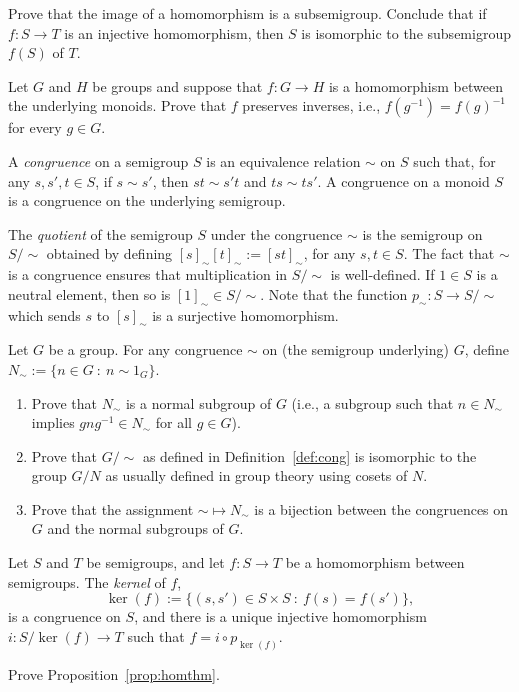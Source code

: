 \begin{exercise}\easy\label{exe:image}
Prove that the image of a homomorphism is a subsemigroup. Conclude that if $f \colon S \to T$ is an injective homomorphism, then $S$ is isomorphic to the subsemigroup $f(S)$ of $T$.
\end{exercise}
\begin{exercise}\easy
  Let $G$ and $H$ be groups and suppose that $f \colon G \to H$ is a homomorphism between the underlying monoids. Prove that $f$ preserves inverses, i.e., $f(g^{-1}) = f(g)^{-1}$ for every $g \in G$.
\end{exercise}

\begin{definition}\label{def:cong}
  A \emph{congruence} on a semigroup $S$ is an equivalence relation $\sim$ on $S$ such that, for any $s, s', t \in S$, if $s \sim s'$, then $st \sim s't$ and $ts \sim ts'$. A congruence on a monoid $S$ is a congruence on the underlying semigroup.

The \emph{quotient} of the semigroup $S$ under the congruence $\sim$ is the semigroup on $S/{\sim}$ obtained by defining $[s]_\sim [t]_\sim := [st]_\sim$, for any $s, t \in S$. The fact that $\sim$ is a congruence ensures that multiplication in $S/{\sim}$ is well-defined. If $1 \in S$ is a neutral element, then so is $[1]_\sim \in S/{\sim}$. Note that the function $p_\sim \colon S \to S/{\sim}$ which sends $s$ to $[s]_\sim$ is a surjective homomorphism. 
\end{definition}

\begin{exercise}
Let $G$ be a group. For any congruence $\sim$ on (the semigroup underlying) $G$, define $N_\sim := \{n \in G \ \colon \ n \sim 1_G\}$. 
\begin{enumerate}
\item\easy  Prove that $N_\sim$ is a normal subgroup of $G$ (i.e., a subgroup such that $n \in N_\sim$ implies $gng^{-1} \in N_\sim$ for all $g \in G$).
\item\easy Prove that $G/{\sim}$ as defined in Definition~\ref{def:cong} is isomorphic to the group $G/N$ as usually defined in group theory using cosets of $N$.
\item\medium  Prove that the assignment ${\sim} \mapsto {N_\sim}$ is a bijection between the congruences on $G$ and the normal subgroups of $G$.
\end{enumerate}
\end{exercise}

\begin{proposition}\label{prop:homthm}
Let $S$ and $T$ be semigroups, and let $f \colon S \to T$ be a homomorphism between semigroups. The \emph{kernel} of $f$, 
\[ \ker(f) := \{(s,s') \in S \times S \ \colon \ f(s) = f(s') \},\]
is a congruence on $S$, and there is a unique injective homomorphism $i \colon S/{\ker(f)} \to T$ such that $f = i \circ p_{\ker(f)}$.
\end{proposition}
\begin{exercise}\medium
Prove Proposition~\ref{prop:homthm}.
\end{exercise}

